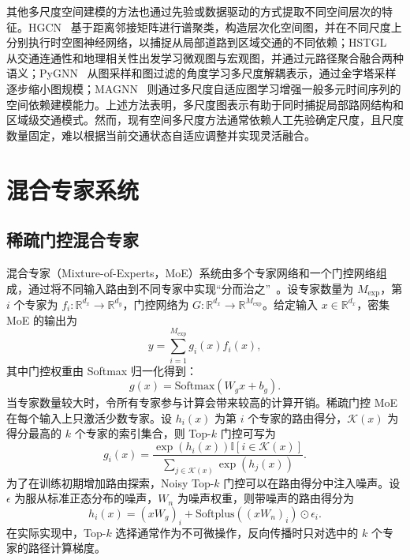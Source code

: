 其他多尺度空间建模的方法也通过先验或数据驱动的方式提取不同空间层次的特征。HGCN~\cite{hgcn} 基于距离邻接矩阵进行谱聚类，构造层次化空间图，并在不同尺度上分别执行时空图神经网络，以捕捉从局部道路到区域交通的不同依赖；HSTGL~\cite{hstgl} 从交通连通性和地理相关性出发学习微观图与宏观图，并通过元路径聚合融合两种语义；PyGNN~\cite{pygnn} 从图采样和图过滤的角度学习多尺度解耦表示，通过金字塔采样逐步缩小图规模；MAGNN~\cite{magnn} 则通过多尺度自适应图学习增强一般多元时间序列的空间依赖建模能力。上述方法表明，多尺度图表示有助于同时捕捉局部路网结构和区域级交通模式。然而，现有空间多尺度方法通常依赖人工先验确定尺度，且尺度数量固定，难以根据当前交通状态自适应调整并实现灵活融合。

\section{混合专家系统}

\subsection{稀疏门控混合专家}

混合专家（Mixture-of-Experts，MoE）系统由多个专家网络和一个门控网络组成，通过将不同输入路由到不同专家中实现“分而治之”~\cite{moe,moe-survey}。设专家数量为 $M_{\mathrm{exp}}$，第 $i$ 个专家为 $f_i: \mathbb{R}^{d_x} \to \mathbb{R}^{d_y}$，门控网络为 $G: \mathbb{R}^{d_x} \to \mathbb{R}^{M_{\mathrm{exp}}}$。给定输入 $x \in \mathbb{R}^{d_x}$，密集 MoE 的输出为
\begin{equation}
y = \sum_{i=1}^{M_{\mathrm{exp}}} g_i(x) f_i(x),
\end{equation}
其中门控权重由 Softmax 归一化得到：
\begin{equation}
g(x) = \mathrm{Softmax}\!\left(W_{g} x + b_g\right).
\end{equation}
当专家数量较大时，令所有专家参与计算会带来较高的计算开销。稀疏门控 MoE~\cite{moe} 在每个输入上只激活少数专家。设 $h_i(x)$ 为第 $i$ 个专家的路由得分，$\mathcal{K}(x)$ 为得分最高的 $k$ 个专家的索引集合，则 Top-$k$ 门控可写为
\begin{equation}
g_i(x)
=
\frac{\exp\!\left(h_i(x)\right) \mathbb{I}\!\left[i \in \mathcal{K}(x)\right]}
{\sum_{j \in \mathcal{K}(x)} \exp\!\left(h_j(x)\right)}.
\end{equation}
为了在训练初期增加路由探索，Noisy Top-$k$ 门控可以在路由得分中注入噪声。设 $\epsilon$ 为服从标准正态分布的噪声，$W_{n}$ 为噪声权重，则带噪声的路由得分为
\begin{equation}
h_i(x) = \left(x W_{g}\right)_i + \mathrm{Softplus}\!\left(\left(x W_{n}\right)_i\right) \odot \epsilon_i.
\end{equation}
在实际实现中，Top-$k$ 选择通常作为不可微操作，反向传播时只对选中的 $k$ 个专家的路径计算梯度。


